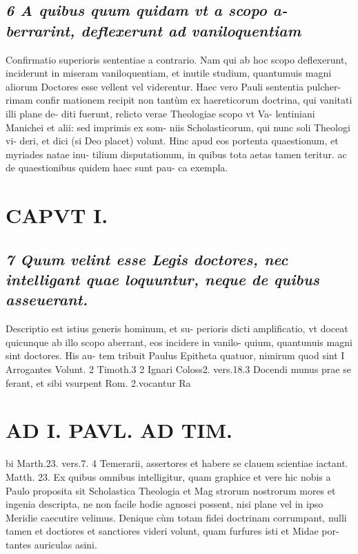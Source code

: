 \documentclass{article}
\begin{document}
\begin{pages}
\subsection*{\textit{6 A quibus quum quidam vt a scopo a- berrarint, deflexerunt ad vaniloquentiam }}\pstart Confirmatio superioris sententiae a contrario. Nam qui ab hoc scopo deflexerunt, inciderunt in miseram vaniloquentiam, et inutile studium, quantumuis magni aliorum Doctores esse vellent vel viderentur. Haec vero Pauli sententia pulcher- rimam confir mationem recipit non tantùm ex haereticorum doctrina, qui vanitati illi plane de- diti fuerunt, relicto verae Theologiae scopo vt Va- lentiniani Manichei et alii: sed imprimis ex som- niis Scholasticorum, qui nunc soli Theologi vi- deri, et dici (si Deo placet) volunt. Hinc apud eos portenta quaestionum, et myriades natae inu- tilium disputationum, in quibus tota aetas tamen teritur. ac de quaestionibus quidem haec sunt pau- ca exempla.  \pend
\section*{CAPVT I. }
\marginpar{[ p.17 ]}
{}
\subsection*{\textit{7 Quum velint esse Legis doctores, nec intelligant quae loquuntur, neque de quibus asseuerant. }}\pstart Descriptio est istius generis hominum, et su- perioris dicti amplificatio, vt doceat quicunque ab illo scopo aberrant, eos incidere in vanilo- quium, quantunuis magni sint doctores. His au- tem tribuit Paulus Epitheta quatuor, nimirum quod sint I Arrogantes Volunt. 2 Timoth.3 2 Ignari Coloss2. vers.18.3 Docendi munus prae se ferant, et sibi vsurpent Rom. 2.vocantur Ra  \pend
\section*{AD I. PAVL. AD TIM. }
\marginpar{[ p.18 ]}\pstart bi Marth.23. vers.7. 4 Temerarii, assertores et habere se clauem scientiae iactant. Matth. 23. Ex quibus omnibus intelligitur, quam graphice et vere hic nobis a Paulo proposita sit Scholastica Theologia et Mag strorum nostrorum mores et ingenia descripta, ne non facile hodie agnosci possent, nisi plane vel in ipso Meridie caecutire velimus. Denique cùm totam fidei doctrinam corrumpant, nulli tamen et doctiores et sanctiores videri volunt, quam furfures isti et Midae por- tantes auriculas asini.  \pend
{}
{}

\end{pages}
\end{document}
